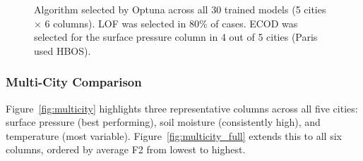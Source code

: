 \documentclass[12pt]{article}
\begin{document}
\begin{figure}[!htbp]
\begin{center}
\end{center}
\caption{Algorithm selected by Optuna across all 30 trained models (5 cities $\times$ 6 columns). LOF was selected in 80\% of cases. ECOD was selected for the surface pressure column in 4 out of 5 cities (Paris used HBOS).}
\label{fig:donut}
\end{figure}

\subsubsection{Multi-City Comparison}

Figure~\ref{fig:multicity} highlights three representative columns across all five cities: surface pressure (best performing), soil moisture (consistently high), and temperature (most variable). Figure~\ref{fig:multicity_full} extends this to all six columns, ordered by average F2 from lowest to highest.
\end{document}
